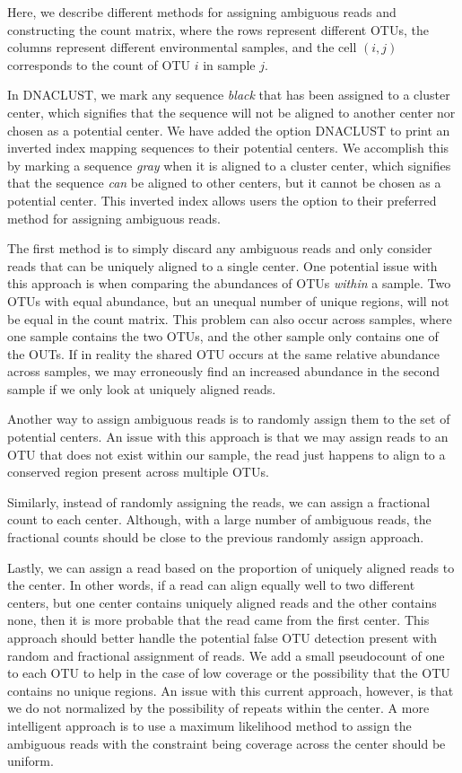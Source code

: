Here, we describe different methods for assigning ambiguous reads and constructing the count matrix, where the rows represent different OTUs, the columns represent different environmental samples, and the cell $(i,j)$ corresponds to the count of OTU $i$ in sample $j$.

In DNACLUST, we mark any sequence \emph{black} that has been assigned to a cluster center, which signifies that the sequence will not be aligned to another center nor chosen as a potential center.
We have added the option DNACLUST to print an inverted index mapping sequences to their potential centers.
We accomplish this by marking a sequence \emph{gray} when it is aligned to a cluster center, which signifies that the sequence \emph{can} be aligned to other centers, but it cannot be chosen as a potential center.
This inverted index allows users the option to their preferred method for assigning ambiguous reads.

The first method is to simply discard any ambiguous reads and only consider reads that can be uniquely aligned to a single center.
One potential issue with this approach is when comparing the abundances of OTUs \emph{within} a sample.
Two OTUs with equal abundance, but an unequal number of unique regions, will not be equal in the count matrix.
This problem can also occur across samples, where one sample contains the two OTUs, and the other sample only contains one of the OUTs.
If in reality the shared OTU occurs at the same relative abundance across samples, we may erroneously find an increased abundance in the second sample if we only look at uniquely aligned reads.

Another way to assign ambiguous reads is to randomly assign them to the set of potential centers.
An issue with this approach is that we may assign reads to an OTU that does not exist within our sample, the read just happens to align to a conserved region present across multiple OTUs.

Similarly, instead of randomly assigning the reads, we can assign a fractional count to each center.  Although, with a large number of ambiguous reads, the fractional counts should be close to the previous randomly assign approach.

Lastly, we can assign a read based on the proportion of uniquely aligned reads to the center.  In other words, if a read can align equally well to two different centers, but one center contains uniquely aligned reads and the other contains none, then it is more probable that the read came from the first center.  This approach should better handle the potential false OTU detection present with random and fractional assignment of reads.
We add a small pseudocount of one to each OTU to help in the case of low coverage or the possibility that the OTU contains no unique regions.
An issue with this current approach, however, is that we do not normalized by the possibility of repeats within the center.
A more intelligent approach is to use a maximum likelihood method to assign the ambiguous reads with the constraint being coverage across the center should be uniform\cite{patro2013sailfish}.

